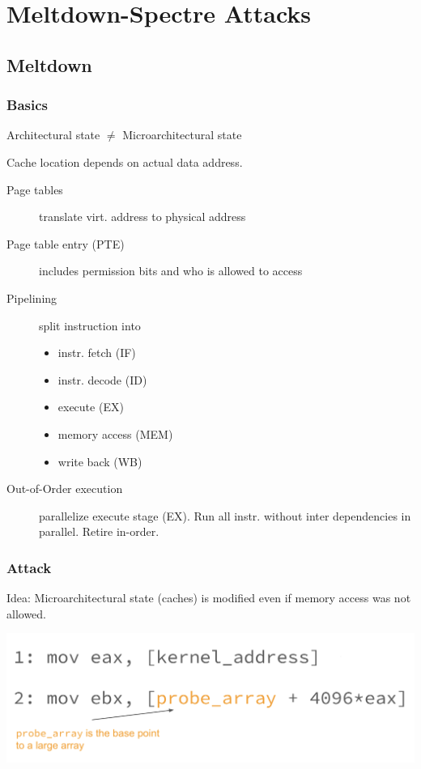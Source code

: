 \section{Meltdown-Spectre Attacks}
\subsection{Meltdown}
\subsubsection{Basics}
Architectural state $\not = $ Microarchitectural state

Cache location depends on actual data address.

\begin{description}
    \item[Page tables] translate virt. address to physical address
    \item[Page table entry (PTE)] includes permission bits and who is allowed to access
    \item[Pipelining] split instruction into
        \begin{itemize}
            \item instr. fetch (IF)
            \item instr. decode (ID)
            \item execute (EX)
            \item memory access (MEM)
            \item write back (WB)
        \end{itemize}
    \item[Out-of-Order execution] parallelize execute stage (EX). Run all instr. without inter dependencies in parallel. Retire in-order.
\end{description}


\subsubsection{Attack}
Idea: Microarchitectural state (caches) is modified even if memory access was not allowed.

\begin{center}
    \includegraphics[width=0.8\linewidth]{images/meltdown-cache.png}
\end{center}

